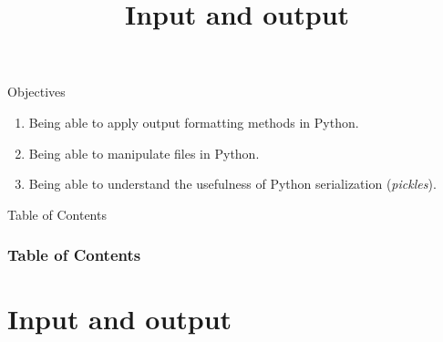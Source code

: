 \documentclass[10pt,compress]{beamer} %
\title[Input and output]{Input and output}
\author{}
\institute{\asignatura}
\date{}
\begin{document}
{\titlepageBlue
    \begin{frame}
        \titlepage
    \end{frame}
}

\begin{frame}[plain]{}
	\begin{block}{Objectives}
		\begin{enumerate}
		\item Being able to apply output formatting methods in Python.
		\item Being able to manipulate files in Python.
		\item Being able to understand the usefulness of Python serialization (\textit{pickles}).
		\end{enumerate}
	\end{block}
\end{frame}

{
\begin{frame}[shrink]{Table of Contents}
 \frametitle{Table of Contents}
 \tableofcontents
\end{frame}
}

\section{Input and output}
\end{document}
